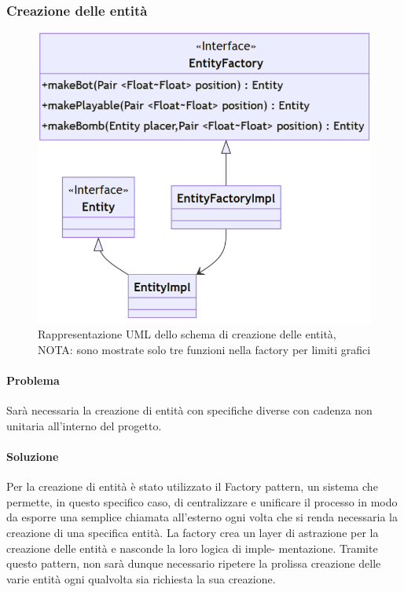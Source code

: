 \documentclass[a4paper,12pt]{report}
\begin{document}
%
\subsubsection*{Creazione delle entità}
%
\begin{figure}[H]
    \centering{}
    \includegraphics[width=1\textwidth]{img/UMLEntityFactory.png}
    \caption{Rappresentazione UML dello schema di creazione delle entità,
        NOTA: sono mostrate solo tre funzioni nella factory per limiti grafici
    }
\end{figure}
%	
\paragraph*{Problema}  Sarà necessaria la creazione di entità con specifiche diverse con cadenza non unitaria all’interno del progetto.
%
\paragraph*{Soluzione} Per la creazione di entità è stato utilizzato il Factory pattern, un sistema che permette, in questo specifico caso, di centralizzare e unificare il processo in modo da esporre una semplice chiamata all’esterno ogni volta che si renda necessaria la creazione di una specifica entità. La factory crea un layer di
astrazione per la creazione delle entità e nasconde la loro logica di imple-
mentazione. Tramite questo pattern, non sarà  dunque necessario ripetere la prolissa creazione delle varie entità ogni qualvolta sia richiesta la sua creazione.
\end{document}
